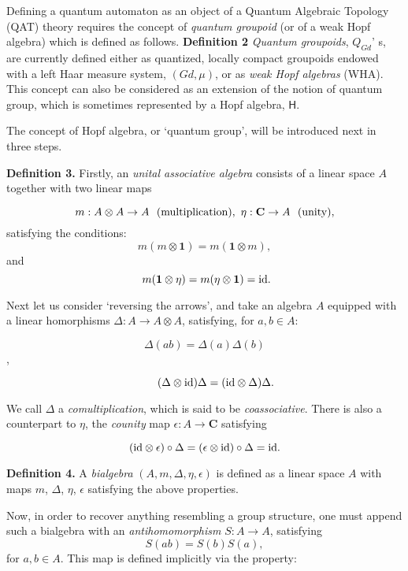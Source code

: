 \documentclass[12pt]{article}
\theoremstyle{plain}
\theoremstyle{definition}
\numberwithin{equation}{section}
\newcommand{\ID}{{\rm id}}
\begin{document}
Defining a quantum automaton as an object of a Quantum Algebraic Topology (QAT)  theory requires the concept of \emph{quantum groupoid} (or of a weak Hopf algebra) which is defined as follows.
\bigbreak
\textbf{Definition 2} \emph{Quantum groupoids}, $Q_{Gd}$' s, are currently defined either as quantized, locally compact groupoids endowed with a left Haar measure system, $(Gd,\mu)$, or as \emph{weak Hopf algebras} (WHA). This concept can also be considered as an extension of the notion of quantum group, which is sometimes represented by a Hopf algebra, $\mathsf{H}$. 

\bigbreak
The concept of Hopf algebra, or `quantum group', will be introduced next in three steps.

\textbf{Definition 3.}
Firstly, an \emph{unital associative algebra} consists of a linear space $A$ together with two linear maps

$$m  : A \otimes A \rightarrow A ~ ~ {\rm{(multiplication)}}, ~
\eta : \mathbf{C} \rightarrow A ~ ~   {\rm{(unity)}},$$
satisfying the conditions:
$$m(m \otimes {\mathbf 1})  = m ({\mathbf 1} \otimes m),$$
and
$$ ~ m({\mathbf 1} \otimes \eta)  = m (\eta \otimes {\mathbf 1}) = \ID.$$

Next let us consider `reversing the arrows', and take an
algebra $A$ equipped with a linear homorphisms 
$\Delta : A \rightarrow A \otimes A$, satisfying, for $a,b \in A$:

$$ \Delta(ab) = \Delta(a) \Delta(b)$$,

$$\qquad (\Delta \otimes \ID) \Delta  = (\ID \otimes \Delta) \Delta.$$

We call $\Delta$ a \emph{comultiplication}, which is said to be \emph{coassociative}.
There is also a counterpart to $\eta$, the \emph{counity} map
$\epsilon : A \rightarrow \textbf{C}$ satisfying

\begin{equation}
(\ID \otimes \epsilon) \circ \Delta = (\epsilon \otimes \ID) \circ \Delta
= \ID. \end{equation}

\textbf{Definition 4.}
A \emph{bialgebra} $(A, m, \Delta, \eta, \epsilon)$ is defined as a linear space $A$ with maps $m$, $\Delta$, $\eta$, $\epsilon$ satisfying the above properties.

Now, in order to recover anything resembling a group structure, one must append such a bialgebra with an \emph{antihomomorphism}
$S : A \rightarrow A$,  satisfying
\begin{equation}
 S(ab) = S(b) S(a),
\end{equation} for $a,b \in A$.  This map is defined implicitly via the property:
\end{document}
